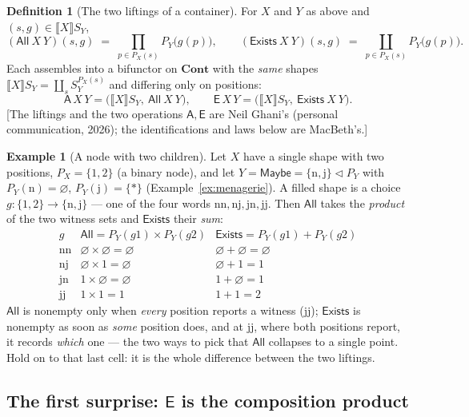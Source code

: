\documentclass[11pt,a4paper]{book}
\newcommand{\Cont}{\mathbf{Cont}}
\newcommand{\cont}[2]{#1 \triangleleft #2}
\newcommand{\Ext}[1]{\llbracket #1 \rrbracket}
\theoremstyle{plain}
\theoremstyle{definition}
\newtheorem{Definition}[Theorem]{Definition}
\newtheorem{Example}[Theorem]{Example}
\theoremstyle{remark}
\newcommand{\prov}[1]{\hfill\textsf{\footnotesize[#1]}}
\begin{document}
\begin{Definition}[The two liftings of a container]\label{def:all-exists}
For $X$ and $Y$ as above and $(s,g)\in\Ext X{S_Y}$,
\[
  (\mathsf{All}\ X\ Y)(s,g)\;=\;\prod_{p\in P_X(s)}P_Y\bigl(g(p)\bigr),
  \qquad
  (\mathsf{Exists}\ X\ Y)(s,g)\;=\;\coprod_{p\in P_X(s)}P_Y\bigl(g(p)\bigr).
\]
Each assembles into a bifunctor on $\Cont$ with the \emph{same} shapes
$\Ext X{S_Y}=\coprod_s S_Y^{P_X(s)}$ and differing only on positions:
\[
  \mathsf A\,X\,Y=\bigl(\Ext X{S_Y},\ \mathsf{All}\ X\ Y\bigr),
  \qquad
  \mathsf E\,X\,Y=\bigl(\Ext X{S_Y},\ \mathsf{Exists}\ X\ Y\bigr).
\]
\prov{The liftings and the two operations $\mathsf A,\mathsf E$ are Neil Ghani's
(personal communication, 2026); the identifications and laws below are MacBeth's.}
\end{Definition}

\begin{Example}[A node with two children]\label{ex:all-exists}
Let $X$ have a single shape with two positions, $P_X=\{1,2\}$ (a binary node), and
let $Y=\mathsf{Maybe}=\cont{\{\mathrm n,\mathrm j\}}{P_Y}$ with $P_Y(\mathrm n)=\varnothing$,
$P_Y(\mathrm j)=\{*\}$ (Example~\ref{ex:menagerie}). A filled shape is a choice
$g\colon\{1,2\}\to\{\mathrm n,\mathrm j\}$ --- one of the four words
$\mathrm{nn},\mathrm{nj},\mathrm{jn},\mathrm{jj}$. Then
$\mathsf{All}$ takes the \emph{product} of the two witness sets and $\mathsf{Exists}$
their \emph{sum}:
\[
\begin{array}{c|c|c}
 g & \mathsf{All}=P_Y(g1)\times P_Y(g2) & \mathsf{Exists}=P_Y(g1)+P_Y(g2)\\\hline
 \mathrm{nn} & \varnothing\times\varnothing=\varnothing & \varnothing+\varnothing=\varnothing\\
 \mathrm{nj} & \varnothing\times 1=\varnothing & \varnothing+1=1\\
 \mathrm{jn} & 1\times\varnothing=\varnothing & 1+\varnothing=1\\
 \mathrm{jj} & 1\times 1=1 & 1+1=2
\end{array}
\]
$\mathsf{All}$ is nonempty only when \emph{every} position reports a witness
($\mathrm{jj}$); $\mathsf{Exists}$ is nonempty as soon as \emph{some} position does,
and at $\mathrm{jj}$, where both positions report, it records \emph{which} one ---
the two ways to pick that $\mathsf{All}$ collapses to a single point. Hold on
to that last cell: it is the whole difference between the two liftings.
\end{Example}

\subsection{The first surprise: \texorpdfstring{$\mathsf E$}{E} is the composition product}
\end{document}
